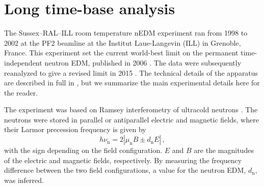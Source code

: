 \section{Long time-base analysis}
The Sussex--RAL--ILL room temperature nEDM experiment ran from 1998 to 2002 at the PF2 beamline at the Institut Laue-Langevin (ILL) in Grenoble, France.
This experiment set the current world-best limit on the permanent time-independent neutron EDM, published in 2006 \cite{Baker2006, Baker2006B}. The data were subsequently reanalyzed to give a revised limit in 2015 \cite{Pendlebury2015}. The technical details of the apparatus are described in full in \cite{Baker2014}, but we summarize the main experimental details here for the reader.

The experiment was based on Ramsey interferometry \cite{Ramsey1950} of ultracold neutrons \cite{UCN-Review1979,UCN-Review1994}.
The neutrons were stored in parallel or antiparallel electric and magnetic fields, where their Larmor precession frequency is given by
\begin{equation}
  \label{eq:Larmor}
  h\nu_\mathrm{n} = 2 \left| \mu_\mathrm{n} B \pm d_\mathrm{n} E \right| \, ,
\end{equation}
with the sign depending on the field configuration.
$E$ and $B$ are the magnitudes of the electric and magnetic fields, respectively.
By measuring the frequency difference between the two field configurations, a value for the neutron EDM, $d_\mathrm{n}$, was inferred.


